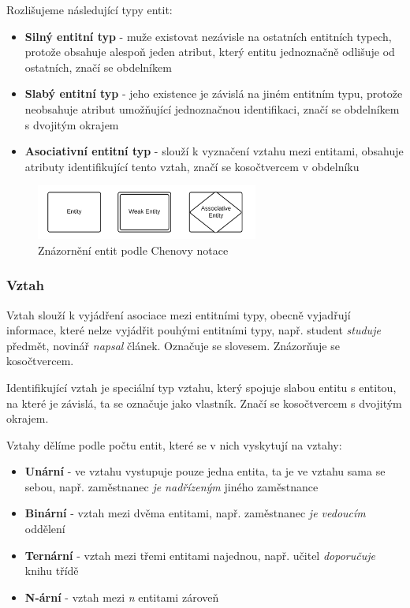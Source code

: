 \documentclass[czech,bachelor,public,dept460,male,oneside]{diploma}
\begin{document}
	Rozlišujeme následující typy entit:

	\begin{itemize}
		\item \textbf{Silný entitní typ} - muže existovat nezávisle na ostatních entitních typech, protože obsahuje alespoň jeden atribut, který entitu jednoznačně odlišuje od ostatních, značí se obdelníkem
		
		\item \textbf{Slabý entitní typ} - jeho existence je závislá na jiném entitním typu, protože neobsahuje atribut umožňující jednoznačnou identifikaci, značí se obdelníkem s dvojitým okrajem
		
		\item \textbf{Asociativní entitní typ} - slouží k vyznačení vztahu mezi entitami, obsahuje atributy identifikující tento vztah, značí se kosočtvercem v obdelníku
	\end{itemize}

	\begin{figure}[!h]
		\centering
		\includegraphics[width=0.65\textwidth]{Figures/ChenEntities}
		\caption{Znázornění entit podle Chenovy notace}
	\end{figure}

	\subsubsection{Vztah}
	Vztah slouží k vyjádření asociace mezi entitními typy, obecně vyjadřují informace, které nelze vyjádřit pouhými entitními typy, např. student \textit{studuje} předmět, novinář \textit{napsal} článek. Označuje se slovesem. Znázorňuje se kosočtvercem. 
	
	Identifikující vztah je speciální typ vztahu, který spojuje slabou entitu s entitou, na které je závislá, ta se označuje jako vlastník. Značí se kosočtvercem s dvojitým okrajem.
	
	Vztahy dělíme podle počtu entit, které se v nich vyskytují na vztahy:
	
	\begin{itemize}
		\item \textbf{Unární} - ve vztahu vystupuje pouze jedna entita, ta je ve vztahu sama se sebou, např. zaměstnanec \textit{je nadřízeným} jiného zaměstnance
		\item \textbf{Binární} - vztah mezi dvěma entitami, např. zaměstnanec \textit{je vedoucím} oddělení
		\item \textbf{Ternární} - vztah mezi třemi entitami najednou, např. učitel \textit{doporučuje} knihu třídě
		\item \textbf{N-ární} - vztah mezi \textit{n} entitami zároveň
	\end{itemize}
	
\end{document}
